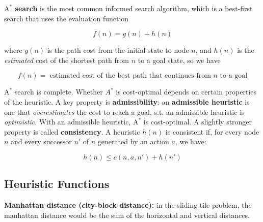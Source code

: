         \textbf{$\text{A}^*$ search} is the most common informed search algorithm, which is a best-first search that uses the evaluation function

        \[
            f(n) = g(n) + h(n)
        \]

        where $g(n)$ is the path cost from the initial state to node $n$, and $h(n)$ is the \textit{estimated} cost of the shortest path from $n$ to a goal state, so we have

        \[
            f(n) = \text{ estimated cost of the best path that continues from $n$ to a goal}
        \]

        $\text{A}^*$ search is complete. Whether $A^*$ is cost-optimal depends on certain properties of the heuristic. A key property is \textbf{admissibility}: an \textbf{admissible heuristic} is one that
        \textit{overestimates} the cost to reach a goal, s.t. an admissible heuristic is \textit{optimistic}. With an admissible heuristic, $\text{A}^*$ is cost-optimal. A slightly stronger property is called
        \textbf{consistency}. A heuristic $h(n)$ is consistent if, for every node $n$ and every successor $n'$ of $n$ generated by an action $a$, we have:

        \[
            h(n) \leq c(n, a, n') + h(n')
        \]



    \subsection{Heuristic Functions}                        %

        \textbf{Manhattan distance (city-block distance):} in the sliding tile problem, the manhattan distance would be the sum of the horizontal and vertical distances.

